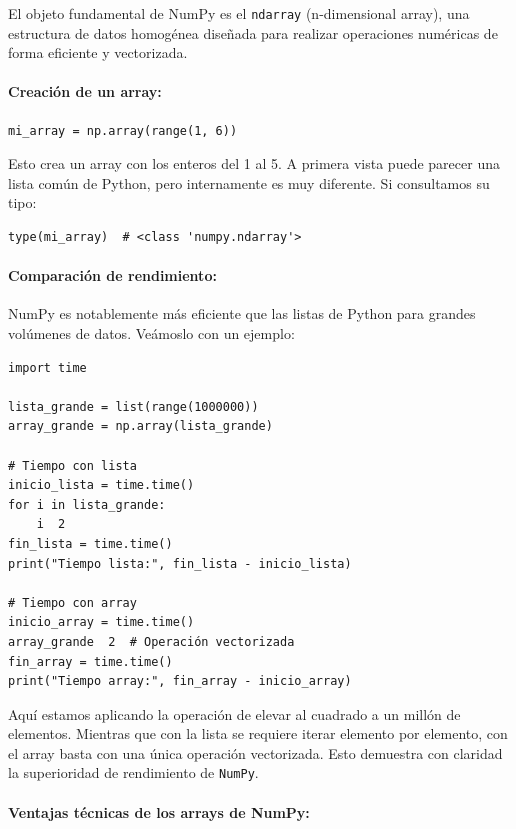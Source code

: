 \documentclass{article}
\theoremstyle{nonumberplain}
\begin{document}
El objeto fundamental de NumPy es el \texttt{ndarray} (n-dimensional array), una estructura de datos homogénea diseñada para realizar operaciones numéricas de forma eficiente y vectorizada.

\paragraph{Creación de un array:}

\begin{verbatim}
mi_array = np.array(range(1, 6))
\end{verbatim}

Esto crea un array con los enteros del 1 al 5. A primera vista puede parecer una lista común de Python, pero internamente es muy diferente. Si consultamos su tipo:

\begin{verbatim}
type(mi_array)  # <class 'numpy.ndarray'>
\end{verbatim}

\paragraph{Comparación de rendimiento:}

NumPy es notablemente más eficiente que las listas de Python para grandes volúmenes de datos. Veámoslo con un ejemplo:

\begin{verbatim}
import time

lista_grande = list(range(1000000))
array_grande = np.array(lista_grande)

# Tiempo con lista
inicio_lista = time.time()
for i in lista_grande:
    i  2
fin_lista = time.time()
print("Tiempo lista:", fin_lista - inicio_lista)

# Tiempo con array
inicio_array = time.time()
array_grande  2  # Operación vectorizada
fin_array = time.time()
print("Tiempo array:", fin_array - inicio_array)
\end{verbatim}

Aquí estamos aplicando la operación de elevar al cuadrado a un millón de elementos. Mientras que con la lista se requiere iterar elemento por elemento, con el array basta con una única operación vectorizada. Esto demuestra con claridad la superioridad de rendimiento de \texttt{NumPy}.

\paragraph{Ventajas técnicas de los arrays de NumPy:}
\end{document}
